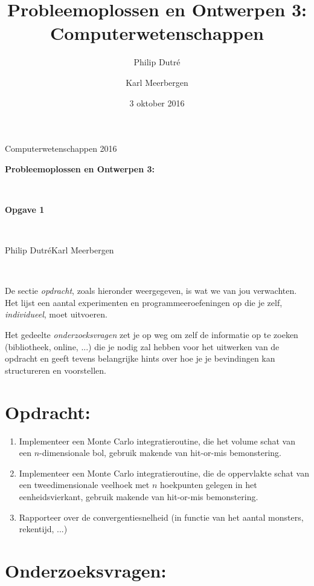 \documentclass[10pt,a4paper]{article}
\title{Probleemoplossen en Ontwerpen 3: Computerwetenschappen}
\author{Philip Dutr\'e \and Karl Meerbergen}
\date{3 oktober 2016}
\begin{document}
\begin{flushright}
	Computerwetenschappen 2016\\[1cm]
\end{flushright}
\begin{center}%
	\begin{huge}
		\textbf{Probleemoplossen en Ontwerpen 3:}
	\end{huge}\\[0.25cm]
	\begin{huge}
		\textbf{\textemdash Opgave 1\textemdash}
	\end{huge}\\[0.75cm]
	\begin{large}
	Philip Dutr\'e\hspace{1cm}Karl Meerbergen
	\end{large}\\[0.75cm]
\end{center}

De sectie \emph{opdracht}, zoals hieronder weergegeven, is wat we van jou verwachten. Het lijst een aantal experimenten en programmeeroefeningen op die je zelf, \emph{individueel}, moet uitvoeren.

Het gedeelte \emph{onderzoeksvragen} zet je op weg om zelf de informatie op te zoeken (bibliotheek, online, ...) die je nodig zal hebben voor het uitwerken van de opdracht en geeft tevens belangrijke hints over hoe je je bevindingen kan structureren en voorstellen.

\section*{Opdracht:}

\begin{enumerate}
	\item Implementeer een Monte Carlo integratieroutine, die het volume schat van een $n$-dimensionale bol, gebruik makende van hit-or-mis bemonstering.
	\item Implementeer een Monte Carlo integratieroutine, die de oppervlakte schat van een tweedimensionale veelhoek met $n$ hoekpunten gelegen in het eenheidsvierkant, gebruik makende van hit-or-mis bemonstering.
	\item Rapporteer over de convergentiesnelheid (in functie van het aantal monsters, rekentijd, ...)
\end{enumerate}

\section*{Onderzoeksvragen:}
\end{document}
